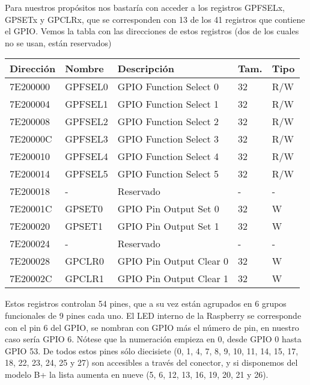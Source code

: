 Para nuestros propósitos nos bastaría con acceder a los registros GPFSELx, GPSETx y GPCLRx,
que se corresponden con 13 de los 41 registros que contiene el GPIO. Vemos la tabla con las
direcciones de estos registros (dos de los cuales no se usan, están reservados)

\begin{longtable}{ p{1.8cm} | p{2cm} | p{5cm} | p{1cm} | p{1cm} }
\hline
{\bf Dirección} & {\bf Nombre} & {\bf Descripción} & {\bf Tam.} & {\bf Tipo} \\ \hline
7E200000 & GPFSEL0 & GPIO Function Select 0 & 32 & R/W \\ \hline
7E200004 & GPFSEL1 & GPIO Function Select 1 & 32 & R/W \\ \hline
7E200008 & GPFSEL2 & GPIO Function Select 2 & 32 & R/W \\ \hline
7E20000C & GPFSEL3 & GPIO Function Select 3 & 32 & R/W \\ \hline
7E200010 & GPFSEL4 & GPIO Function Select 4 & 32 & R/W \\ \hline
7E200014 & GPFSEL5 & GPIO Function Select 5 & 32 & R/W \\ \hline
7E200018 & -       & Reservado              & -  & -   \\ \hline
7E20001C & GPSET0  & GPIO Pin Output Set 0  & 32 & W   \\ \hline
7E200020 & GPSET1  & GPIO Pin Output Set 1  & 32 & W   \\ \hline
7E200024 & -       & Reservado              & -  & -   \\ \hline
7E200028 & GPCLR0  & GPIO Pin Output Clear 0 & 32 & W  \\ \hline
7E20002C & GPCLR1  & GPIO Pin Output Clear 1 & 32 & W  \\ \hline
\end{longtable}

Estos registros controlan 54 pines, que a su vez están agrupados
en 6 grupos funcionales de 9 pines cada uno. El LED interno de la
Raspberry se corresponde con el pin 6 del GPIO, se nombran con
GPIO más el número de pin, en nuestro caso sería GPIO 6. Nótese
que la numeración empieza en 0, desde GPIO 0 hasta GPIO 53. De
todos estos pines sólo diecisiete (0, 1, 4, 7, 8, 9, 10, 11, 14, 15, 17, 18, 22, 23, 24, 25 y 27)
son accesibles a través del conector, y si disponemos del modelo B+ la lista
aumenta en nueve (5, 6, 12, 13, 16, 19, 20, 21 y 26).






\chapterend{}

